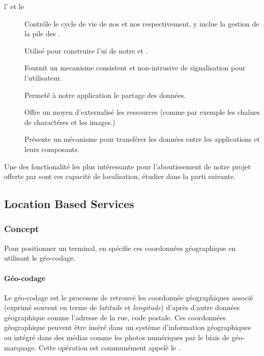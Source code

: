 \begin{description}

\item [l' et le ]
Contrôle le cycle de vie de nos  et nos  respectivement, y inclue la gestion de la pile des .

\item[]
Utilisé pour construire l'\gls{ui} de notre  et .

\item[]
Fournit un mecanisme consistent et non-intrusive de signalisation pour l'utilisateur.

\item[]
Permeté à notre application le partage des données.

\item[]
Offre un moyen d'externalisé les ressources (comme par exemple les chaînes de charactéres et les images.)

\item[]
Présente un mécanisme pour transférer les données entre les applications et leurs composants.

\end{description}

Une des fonctionalité les plus intéressante pour l'aboutissement de notre projet offerte par \android{} sont ces capacité de localisation, étudier dans la parti suivante.

\subsection{Location Based Services}

\subsubsection{Concept}

Pour positionner un terminal, en spécifie ces coordonnées géographique en utilisant le géo-codage.

\paragraph[Géo-codage]{Géo-codage\cite{wiki:geocoding}}
Le géo-codage est le processus de retrouvé les coordonnée géographiques associé (exprimé souvent en terme de \textit{latitude} et \textit{longitude}) d'après d'autre données géographique comme l'adresse de la rue, code postale. Ces coordonnées géographique peuvent être inséré dans un système d'information géographiques ou intégré dans des médias comme les photos numériques par le biais de géo-marquage. Cette opération est communément appelé le .

